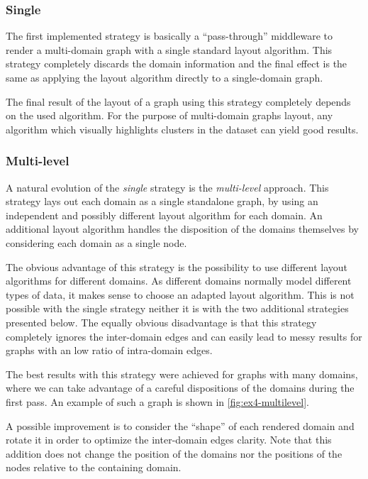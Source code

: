 \subsubsection{Single}

The first implemented strategy is basically a ``pass-through'' middleware to render a multi-domain graph with a single standard layout algorithm. This strategy completely discards the domain information and the final effect is the same as applying the layout algorithm directly to a single-domain graph.

The final result of the layout of a graph using this strategy completely depends on the used algorithm. For the purpose of multi-domain graphs layout, any algorithm which visually highlights clusters in the dataset can yield good results.

\subsubsection{Multi-level}

A natural evolution of the \emph{single} strategy is the \emph{multi-level} approach. This strategy lays out each domain as a single standalone graph, by using an independent and possibly different layout algorithm for each domain. An additional layout algorithm handles the disposition of the domains themselves by considering each domain as a single node.

The obvious advantage of this strategy is the possibility to use different layout algorithms for different domains. As different domains normally model different types of data, it makes sense to choose an adapted layout algorithm. This is not possible with the single strategy neither it is with the two additional strategies presented below. The equally obvious disadvantage is that this strategy completely ignores the inter-domain edges and can easily lead to messy results for graphs with an low ratio of intra-domain edges.

The best results with this strategy were achieved for graphs with many domains, where we can take advantage of a careful dispositions of the domains during the first pass. An example of such a graph is shown in \vref{fig:ex4-multilevel}.

A possible improvement is to consider the ``shape'' of each rendered domain and rotate it in order to optimize the inter-domain edges clarity. Note that this addition does not change the position of the domains nor the positions of the nodes relative to the containing domain.

